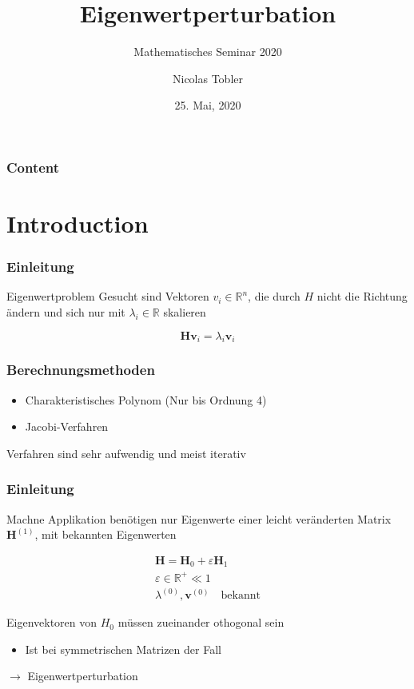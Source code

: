 \documentclass[ngerman, aspectratio=169]{beamer}
\title{Eigenwertperturbation}
\subtitle{Mathematisches Seminar 2020}
\author{Nicolas Tobler}
\institute{HSR Hochschule für Technik Rapperswil}
\date{25. Mai, 2020}
\begin{document}
	
	\begin{frame}
		\titlepage
	\end{frame}
	
	\begin{frame}
		\frametitle{Content}
		\tableofcontents
	\end{frame}
	
	\section{Introduction}


	\begin{frame}
		\frametitle{Einleitung}

		\begin{block}{Eigenwertproblem}
			Gesucht sind Vektoren $v_i \in \mathbb {R}^{n} $, die durch $H$ nicht die Richtung ändern und sich nur mit $\lambda_i \in \mathbb R$ skalieren
			
            \begin{equation}
                \bm H \bm v_i = \lambda_i \bm v_i
			\end{equation}
        \end{block}

	\end{frame}

	\begin{frame}
		\frametitle{Berechnungsmethoden}

		\begin{itemize}
			\item Charakteristisches Polynom (Nur bis Ordnung 4)
			\item Jacobi-Verfahren
		\end{itemize}

		Verfahren sind sehr aufwendig und meist iterativ

	\end{frame}

	\begin{frame}
		\frametitle{Einleitung}
		
		

		\begin{block}{Machne Applikation benötigen nur Eigenwerte einer leicht veränderten Matrix $\bm H^{(1)}$, mit bekannten Eigenwerten}
			
			\begin{gather*}
				\bm H = \bm H_0 + \varepsilon \bm H_1 \\
				\varepsilon \in \mathbb{R^+} \ll 1 \\
				\lambda^{(0)}, \bm v^{(0)} \quad \text{bekannt}
			\end{gather*}

			Eigenvektoren von $H_0$ müssen zueinander othogonal sein
			\begin{itemize}
				\item Ist bei symmetrischen Matrizen der Fall
			\end{itemize}
			

            $\rightarrow$ Eigenwertperturbation
        \end{block}

	\end{frame}
\end{document}
